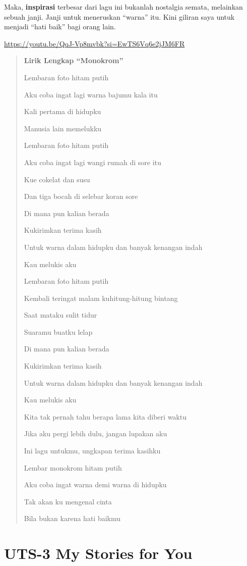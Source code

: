 \documentclass[
  letterpaper,
  DIV=11,
  numbers=noendperiod]{scrreprt}
\begin{document}
Maka, \textbf{inspirasi} terbesar dari lagu ini bukanlah nostalgia
semata, melainkan sebuah janji. Janji untuk meneruskan ``warna'' itu.
Kini giliran saya untuk menjadi ``hati baik'' bagi orang lain.

\url{https://youtu.be/QqJ-Vp8mvbk?si=EwTS6Vq6e2jJM6FR}

\begin{quote}
\textbf{Lirik Lengkap ``Monokrom''}

Lembaran foto hitam putih

Aku coba ingat lagi warna bajumu kala itu

Kali pertama di hidupku

Manusia lain memelukku

Lembaran foto hitam putih

Aku coba ingat lagi wangi rumah di sore itu

Kue cokelat dan susu

Dan tiga bocah di selebar koran sore

Di mana pun kalian berada

Kukirimkan terima kasih

Untuk warna dalam hidupku dan banyak kenangan indah

Kau melukis aku

Lembaran foto hitam putih

Kembali teringat malam kuhitung-hitung bintang

Saat mataku sulit tidur

Suaramu buatku lelap

Di mana pun kalian berada

Kukirimkan terima kasih

Untuk warna dalam hidupku dan banyak kenangan indah

Kau melukis aku

Kita tak pernah tahu berapa lama kita diberi waktu

Jika aku pergi lebih dulu, jangan lupakan aku

Ini lagu untukmu, ungkapan terima kasihku

Lembar monokrom hitam putih

Aku coba ingat warna demi warna di hidupku

Tak akan ku mengenal cinta

Bila bukan karena hati baikmu
\end{quote}


\chapter{UTS-3 My Stories for You}\label{uts-3-my-stories-for-you}
\end{document}
